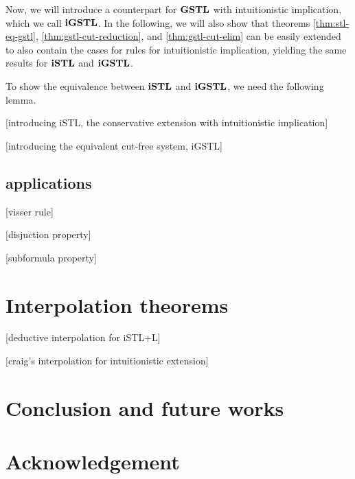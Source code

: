 \documentclass[12pt,a4paper]{article}
\begin{document}
Now, we will introduce a counterpart for $\mathbf{GSTL}$ with intuitionistic implication, which we call $\mathbf{iGSTL}$. In the following, we will also show that theorems \ref{thm:stl-eq-gstl}, \ref{thm:gstl-cut-reduction}, and \ref{thm:gstl-cut-elim} can be easily extended to also contain the cases for rules for intuitionistic implication, yielding the same results for $\mathbf{iSTL}$ and $\mathbf{iGSTL}$.



To show the equivalence between $\mathbf{iSTL}$ and $\mathbf{iGSTL}$, we need the following lemma.



[introducing iSTL, the conservative extension with intuitionistic implication]

[introducing the equivalent cut-free system, iGSTL]

\subsection{applications}
[visser rule]

[disjuction property]

[subformula property]

\section{Interpolation theorems}
[deductive interpolation for iSTL+L]

[craig's interpolation for intuitionistic extension]

\section{Conclusion and future works}

\section{Acknowledgement}



\end{document}
